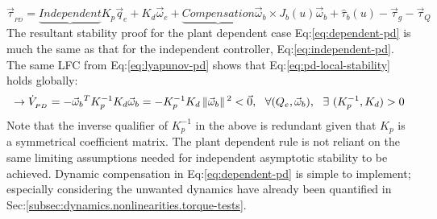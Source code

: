 {\begin{equation}
\vec{\tau}_{_{PD}}=\underbrace{Independent}{K_p\vec{q}_e+K_d\vec{\omega}_e}+\underbrace{Compensation}{\vec{\omega}_b\times J_b(u)\vec{\omega}_b+\hat{\tau}_b(u)-\vec{\tau}_g-\vec{\tau}_Q}
\end{equation}
The resultant stability proof for the plant dependent case Eq:\ref{eq:dependent-pd} is much the same as that for the independent controller, Eq:\ref{eq:independent-pd}. The same LFC from Eq:\ref{eq:lyapunov-pd} shows that Eq:\ref{eq:pd-local-stability} holds globally:
\begin{equation}\label{eq:dependent-global-stability}
\rightarrow\dot{V}_{_{PD}}=-\vec{\omega}_b\text{}^TK_p^{-1}K_d\vec{\omega}_b=-K_p^{-1}K_d\left\lVert\vec{\omega}_b\right\rVert\text{}^2<\vec{0},~~\forall(Q_e,\vec{\omega}_b),~~\exists~(K_p^{-1},K_d)>0
\end{equation}
Note that the inverse qualifier of $K_p^{-1}$ in the above is redundant given that $K_p$ is a symmetrical coefficient matrix. The plant dependent rule is not reliant on the same limiting assumptions needed for independent asymptotic stability to be achieved. Dynamic compensation in Eq:\ref{eq:dependent-pd} is simple to implement; especially considering the unwanted dynamics have already been quantified in Sec:\ref{subsec:dynamics.nonlinearities.torque-tests}.
}
